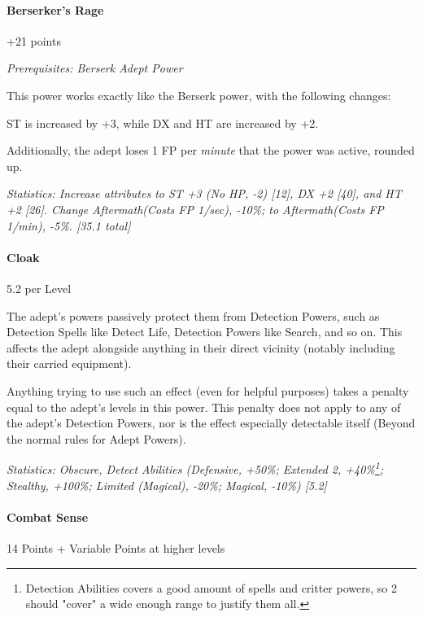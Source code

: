 \begin{multicols}{3}
			
	\paragraph{Berserker's Rage}
	\begin{flushright}
		+21 points
	\end{flushright}
	\begin{flushright}
	\textit{Prerequisites: Berserk Adept Power}
	\end{flushright}
	
	This power works exactly like the Berserk power, with the following changes:
	
	ST is increased by +3, while DX and HT are increased by +2.
	
	Additionally, the adept loses 1 FP per \textit{minute} that the power was active, rounded up.
	
	\textcolor{OliveGreen}{\textit{Statistics: Increase attributes to ST +3 (No HP, -2) [12], DX +2 [40], and HT +2 [26]. Change Aftermath(Costs FP 1/sec), -10\%; to Aftermath(Costs FP 1/min), -5\%. [35.1 total] }}
	
	
	\paragraph{Cloak}
	\begin{flushright}
	 5.2 per Level
	\end{flushright}

	The adept's powers passively protect them from Detection Powers, such as Detection Spells like Detect Life, Detection Powers like Search, and so on. This affects the adept alongside anything in their direct vicinity (notably including their carried equipment).
	
	Anything trying to use such an effect (even for helpful purposes) takes a penalty equal to the adept's levels in this power. This penalty does not apply to any of the adept's Detection Powers, nor is the effect especially detectable itself (Beyond the normal rules for Adept Powers).

	\textcolor{OliveGreen}{\textit{Statistics: Obscure, Detect Abilities (Defensive, +50\%; Extended 2, +40\%\footnote{Detection Abilities covers a good amount of spells and critter powers, so 2 should "cover" a wide enough range to justify them all.}; Stealthy, +100\%; Limited (Magical), -20\%; Magical, -10\%) [5.2]}}
	
	\paragraph{Combat Sense}
	\begin{flushright}
		14 Points + Variable Points at higher levels
	\end{flushright}


\end{multicols}
